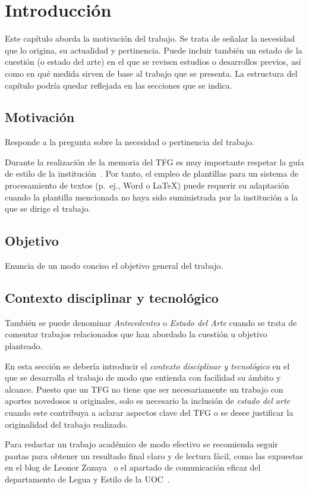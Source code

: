 \chapter{Introducción}
\label{cap:Introduccion}

Este capítulo aborda la motivación del trabajo. Se trata de señalar la necesidad que lo origina, su actualidad y pertinencia. Puede incluir también un estado de la cuestión (o estado del arte) en el que se revisen estudios o desarrollos previos, así como en qué medida sirven de base al trabajo que se presenta. La estructura del capítulo podría quedar reflejada en las secciones que se indica.

\section{Motivación}
Responde a la pregunta sobre la necesidad o pertinencia del trabajo.

Durante la realización de la memoria del TFG es muy importante respetar la guía de estilo de la institución~\cite{esi19}. Por tanto, el empleo de plantillas para un sistema de procesamiento de textos (p.~ej., Word o \LaTeX) puede requerir su adaptación cuando la plantilla mencionada no haya sido suministrada por la institución a la que se dirige el trabajo.

\section{Objetivo}
Enuncia de un modo conciso el objetivo general del trabajo.

\section{Contexto disciplinar y tecnológico}
También se puede denominar \emph{Antecedentes} o \emph{Estado del Arte} cuando se trata de comentar trabajos relacionados que han abordado la cuestión u objetivo planteado.

En esta sección se debería introducir el \emph{contexto disciplinar y tecnológico} en el que se desarrolla el trabajo de modo que entienda con facilidad su ámbito y alcance. Puesto que un TFG no tiene que ser necesariamente un trabajo con aportes novedosos u originales, solo es necesario la inclusión de \emph{estado del arte} cuando este contribuya a aclarar aspectos clave del TFG o se desee justificar la originalidad del trabajo realizado.

Para redactar un trabajo académico de modo efectivo se recomienda seguir pautas para obtener un resultado final claro y de lectura fácil, como las expuestas en el blog de Leonor Zozaya~\cite{zozaya17} o el apartado de comunicación eficaz del departamento de Legua y Estilo de la UOC~\cite{uoc}.


